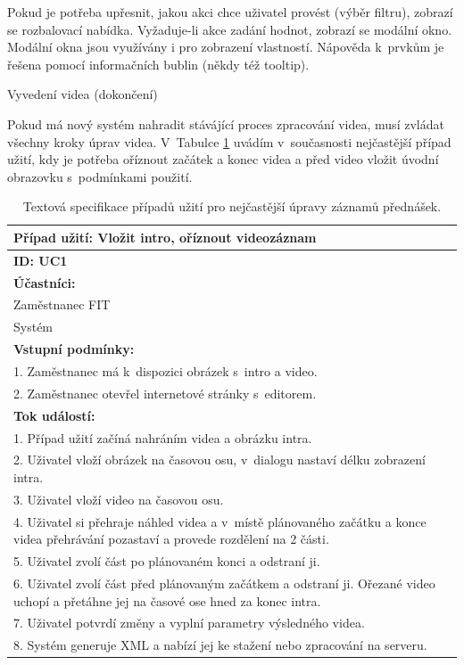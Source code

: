 Pokud je potřeba upřesnit, jakou akci chce uživatel provést (výběr filtru), zobrazí se rozbalovací nabídka. Vyžaduje-li akce zadání hodnot, zobrazí se modální okno. Modální okna jsou využívány i pro zobrazení vlastností. Nápověda k~prvkům je řešena pomocí informačních bublin (někdy též tooltip).

Vyvedení videa (dokončení)

Pokud má nový systém nahradit stávájící proces zpracování videa, musí zvládat všechny kroky úprav videa. V~Tabulce \ref{tab:uc1} uvádím v~současnosti nejčastější případ užití, kdy je potřeba oříznout začátek a konec videa a před video vložit úvodní obrazovku s~podmínkami použití.

\begin{table}[h]
    \centering
    \begin{tabular}{|p{14cm}|}
        \hline
        Případ užití: Vložit intro, oříznout videozáznam\\ \hline
        \textbf{ID: UC1}\\ \hline
        \textbf{Účastníci:}\\
        Zaměstnanec FIT\\
        Systém\\ \hline
        \textbf{Vstupní podmínky:}\\
        1. Zaměstnanec má k~dispozici obrázek s~intro a video.\\
        2. Zaměstnanec otevřel internetové stránky s~editorem.\\ \hline
        \textbf{Tok událostí:}\\
        1. Případ užití začíná nahráním videa a obrázku intra.\\
        2. Uživatel vloží obrázek na časovou osu, v~dialogu nastaví délku zobrazení intra.\\
        3. Uživatel vloží video na časovou osu.\\
        4. Uživatel si přehraje náhled videa a v~místě plánovaného začátku a konce videa přehrávání pozastaví a provede rozdělení na 2 části.\\
        5. Uživatel zvolí část po plánovaném konci a odstraní ji.\\
        6. Uživatel zvolí část před plánovaným začátkem a odstraní ji. Ořezané video uchopí a přetáhne jej na časové ose hned za konec intra.\\
        7. Uživatel potvrdí změny a vyplní parametry výsledného videa.\\
        8. Systém generuje XML a nabízí jej ke stažení nebo zpracování na serveru.\\
        \hline
    \end{tabular}
    \caption{Textová specifikace případů užití pro nejčastější úpravy záznamů přednášek.}
    \label{tab:uc1}
\end{table}

